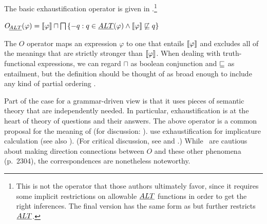\documentclass[leqno]{article}
\begin{document}
The basic exhaustification operator is given in 
\citep{Spector:2007,Fox:2007,Fox:2009,Magri:2009,ChierchiaFoxSpector08}.\footnote{This
  is not the operator that those authors ultimately favor, since it
  requires some implicit restrictions on allowable $\emph{ALT}$ functions in
  order to get the right inferences.  The final version has the same
  form as  but further restricts $\emph{ALT}$.}
%
\begin{examples}
\item\label{def:O}
  $\mathop{O\negthinspace_{\emph{ALT}}}(\varphi) = 
  \llbracket\varphi\rrbracket \sqcap \bigsqcap\left\{  -q : q \in \emph{ALT}(\varphi) \wedge \llbracket\varphi\rrbracket \not\sqsubseteq q \right\}$ 
\end{examples}
%
The $O$ operator maps an expression $\varphi$ to one that entails
$\llbracket\varphi\rrbracket$ and excludes all of the meanings that are strictly
stronger than $\llbracket\varphi\rrbracket$. When dealing with truth-functional
expressions, we can regard $\sqcap$ as boolean conjunction and
$\sqsubseteq$ as entailment, but the definition should be thought of as
broad enough to include any kind of partial ordering
.

Part of the case for a grammar-driven view is that it uses pieces of
semantic theory that are independently needed. In particular,
exhaustification is at the heart of  theory
of questions and their answers. The above operator is a common
proposal for the meaning of  (for discussion:
\citealt{Rooth96,Buring01,BeaverClark08}).  \citet{SchulzVanRooij06}
use exhaustification for implicature calculation (see also
\citealt{deJagerVanRooij07}).  (For critical discussion, see
\citealt{Alonso-Ovalle:2008} and \citealt{Gajewski:2012}.) While \CFS\
are cautious about making direction connections between $O$ and these
other phenomena (p.~2304), the correspondences are nonetheless
noteworthy.
\end{document}
